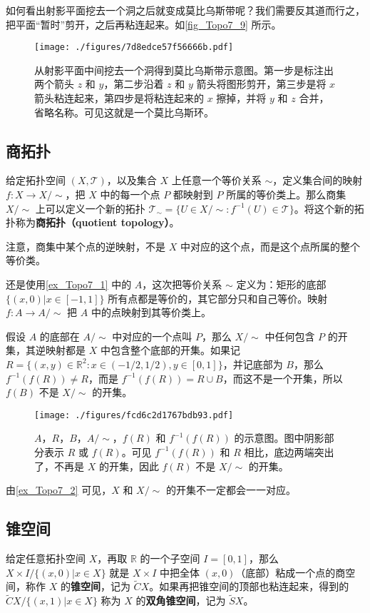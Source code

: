 如何看出射影平面挖去一个洞之后就变成莫比乌斯带呢？我们需要反其道而行之，把平面“暂时”剪开，之后再粘连起来。如\autoref{fig_Topo7_9} 所示。

\begin{figure}[ht]
\centering
\texttt{[image: ./figures/7d8edce57f56666b.pdf]}
\caption{从射影平面中间挖去一个洞得到莫比乌斯带示意图。第一步是标注出两个箭头 $z$ 和 $y$，第二步沿着 $z$ 和 $y$ 箭头将图形剪开，第三步是将 $x$ 箭头粘连起来，第四步是将粘连起来的 $x$ 擦掉，并将 $y$ 和 $z$ 合并，省略名称。可见这就是一个莫比乌斯环。} \label{fig_Topo7_9}
\end{figure}

\subsection{商拓扑}

给定拓扑空间 $(X, \mathcal{T})$，以及集合 $X$ 上任意一个等价关系 $\sim$，定义集合间的映射 $f:X\rightarrow X/\sim$，把 $X$ 中的每一个点 $P$ 都映射到 $P$ 所属的等价类上。那么商集 $X/\sim$ 上可以定义一个新的拓扑 $\mathcal{T}_\sim=\{U\in X/\sim: f^{-1}(U)\in\mathcal{T}\}$。将这个新的拓扑称为\textbf{商拓扑（quotient topology）}。

注意，商集中某个点的逆映射，不是 $X$ 中对应的这个点，而是这个点所属的整个等价类。

\begin{example}{}\label{ex_Topo7_2}

还是使用\autoref{ex_Topo7_1} 中的 $A$，这次把等价关系 $\sim$ 定义为：矩形的底部 $\{(x,0)|x\in[-1,1]\}$ 所有点都是等价的，其它部分只和自己等价。映射 $f:A\rightarrow A/\sim$ 把 $A$ 中的点映射到其等价类上。

假设 $A$ 的底部在 $A/\sim$ 中对应的一个点叫 $P$，那么 $X/\sim$ 中任何包含 $P$ 的开集，其逆映射都是 $X$ 中包含整个底部的开集。如果记 $R=\{(x,y)\in\mathbb{R}^2:x\in(-1/2,1/2),y\in[0,1]\}$，并记底部为 $B$，那么 $f^{-1}(f(R))\not=R$，而是 $f^{-1}(f(R))=R\cup B$，而这不是一个开集，所以 $f(B)$ 不是 $X/\sim$ 的开集。


\begin{figure}[ht]
\centering
\texttt{[image: ./figures/fcd6c2d1767bdb93.pdf]}
\caption{$A$，$R$，$B$，$A/\sim$，$f(R)$ 和 $f^{-1}(f(R))$ 的示意图。图中阴影部分表示 $R$ 或 $f(R)$。可见 $f^{-1}(f(R))$ 和 $R$ 相比，底边两端突出了，不再是 $X$ 的开集，因此 $f(R)$ 不是 $X/\sim$ 的开集。} \label{fig_Topo7_7}
\end{figure}

\end{example}

由\autoref{ex_Topo7_2} 可见，$X$ 和 $X/\sim$ 的开集不一定都会一一对应。

\subsection{锥空间}

给定任意拓扑空间 $X$，再取 $\mathbb{R}$ 的一个子空间 $I=[0,1]$，那么 $X\times I/\{(x,0)|x\in X\}$ 就是 $X\times I$ 中把全体 $(x, 0)$（底部）粘成一个点的商空间，称作 $X$ 的\textbf{锥空间}，记为 $\widetilde{C}X$。如果再把锥空间的顶部也粘连起来，得到的 $\widetilde{C}X/\{(x,1)|x\in X\}$ 称为 $X$ 的\textbf{双角锥空间}，记为 $\widetilde{S}X$。

